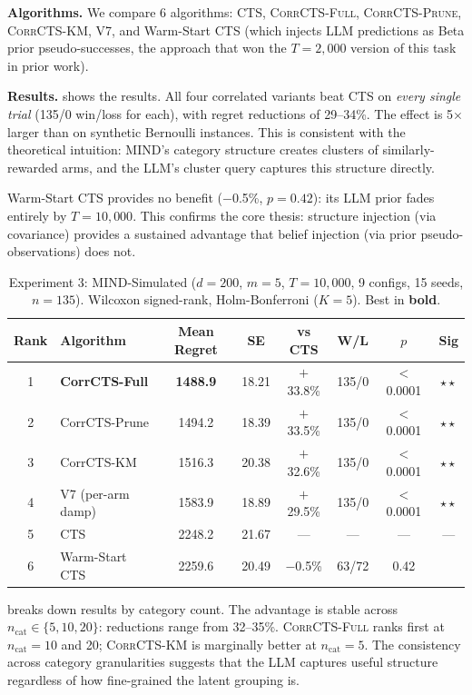 \documentclass{article}
\theoremstyle{plain}
\theoremstyle{definition}
\theoremstyle{remark}
\newcommand{\CorrFull}{\textsc{CorrCTS-Full}}
\newcommand{\EdgePrune}{\textsc{CorrCTS-Prune}}
\newcommand{\KMRefine}{\textsc{CorrCTS-KM}}
\begin{document}
\textbf{Algorithms.}
We compare 6 algorithms: CTS, \CorrFull{}, \EdgePrune{}, \KMRefine{}, V7, and Warm-Start CTS (which injects LLM predictions as Beta prior pseudo-successes, the approach that won the $T{=}2{,}000$ version of this task in prior work).

\textbf{Results.}
 shows the results.
All four correlated variants beat CTS on \emph{every single trial} (135/0 win/loss for each), with regret reductions of 29--34\%.
The effect is 5$\times$ larger than on synthetic Bernoulli instances.
This is consistent with the theoretical intuition: MIND's category structure creates clusters of similarly-rewarded arms, and the LLM's cluster query captures this structure directly.

Warm-Start CTS provides no benefit ($-$0.5\%, $p = 0.42$): its LLM prior fades entirely by $T = 10{,}000$.
This confirms the core thesis: structure injection (via covariance) provides a sustained advantage that belief injection (via prior pseudo-observations) does not.

\begin{table}[t]
\caption{Experiment 3: MIND-Simulated ($d{=}200$, $m{=}5$, $T{=}10{,}000$, 9 configs, 15 seeds, $n{=}135$). Wilcoxon signed-rank, Holm-Bonferroni ($K{=}5$). Best in \textbf{bold}.}
\label{tab:mind}
\centering
\small
\begin{tabular}{@{}clcccccc@{}}
\toprule
Rank & Algorithm & Mean Regret & SE & vs CTS & W/L & $p$ & Sig \\
\midrule
1 & \textbf{CorrCTS-Full} & \textbf{1488.9} & 18.21 & $+$33.8\% & 135/0 & ${<}$0.0001 & $\star\star$ \\
2 & CorrCTS-Prune & 1494.2 & 18.39 & $+$33.5\% & 135/0 & ${<}$0.0001 & $\star\star$ \\
3 & CorrCTS-KM & 1516.3 & 20.38 & $+$32.6\% & 135/0 & ${<}$0.0001 & $\star\star$ \\
4 & V7 (per-arm damp) & 1583.9 & 18.89 & $+$29.5\% & 135/0 & ${<}$0.0001 & $\star\star$ \\
5 & CTS & 2248.2 & 21.67 & --- & --- & --- & --- \\
6 & Warm-Start CTS & 2259.6 & 20.49 & $-$0.5\% & 63/72 & 0.42 & \\
\bottomrule
\end{tabular}
\end{table}

 breaks down results by category count.
The advantage is stable across $n_\text{cat} \in \{5, 10, 20\}$: reductions range from 32--35\%.
\CorrFull{} ranks first at $n_\text{cat} = 10$ and 20; \KMRefine{} is marginally better at $n_\text{cat} = 5$.
The consistency across category granularities suggests that the LLM captures useful structure regardless of how fine-grained the latent grouping is.
\end{document}
